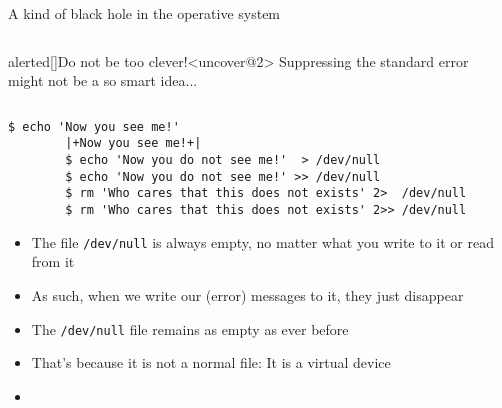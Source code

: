\begin{frame}[fragile]{A kind of black hole in the operative system}
    \vspace{-9mm}
    \begin{columns}[c]
        \begin{column}{0.7\textwidth}
            \begin{varblock}{alerted}[\textwidth]{Do not be too clever!}<uncover@2>
                Suppressing the standard error might not be a so smart idea...
            \end{varblock}
        \end{column}
        \begin{column}{0.3\textwidth}
        \end{column}
    \end{columns}
    \bigskip
    \begin{lstlisting}[style=MyBash, numbers=none]
        $ echo 'Now you see me!'
        |+Now you see me!+|
        $ echo 'Now you do not see me!'  > /dev/null
        $ echo 'Now you do not see me!' >> /dev/null
        $ rm 'Who cares that this does not exists' 2>  /dev/null
        $ rm 'Who cares that this does not exists' 2>> /dev/null
    \end{lstlisting}
    \bigskip
    \begin{itemize}
        \item The file \texttt{/dev/null} is always empty, no matter what you write to it or read from it
        \item As such, when we write our (error) messages to it, they just disappear
        \item The \texttt{/dev/null} file remains as empty as ever before
        \item That's because it is not a normal file: It is a virtual device
        \item {}
    \end{itemize}
\end{frame}
